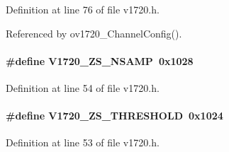 Definition at line 76 of file v1720.h.

Referenced by ov1720\_\-ChannelConfig().
\paragraph[{V1720\_\-ZS\_\-NSAMP}]{\setlength{\rightskip}{0pt plus 5cm}\#define V1720\_\-ZS\_\-NSAMP~0x1028}\hfill\label{v1720_8h_a4cd90908d75ad4882931e48d9260f638}


Definition at line 54 of file v1720.h.
\paragraph[{V1720\_\-ZS\_\-THRESHOLD}]{\setlength{\rightskip}{0pt plus 5cm}\#define V1720\_\-ZS\_\-THRESHOLD~0x1024}\hfill\label{v1720_8h_a05d13f528c2ec6592a38d1bf46de5b35}


Definition at line 53 of file v1720.h.